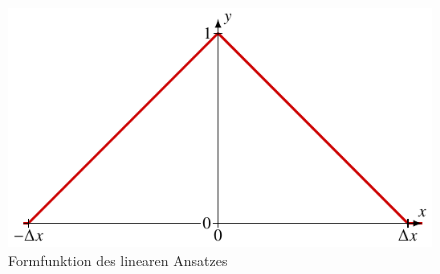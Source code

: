 %
%
%
\begin{figure}
    \centering
    \includegraphics{papers/fem/images/linearer_ansatz.pdf}
    \caption{Formfunktion des linearen Ansatzes} %
    \end{figure}
    